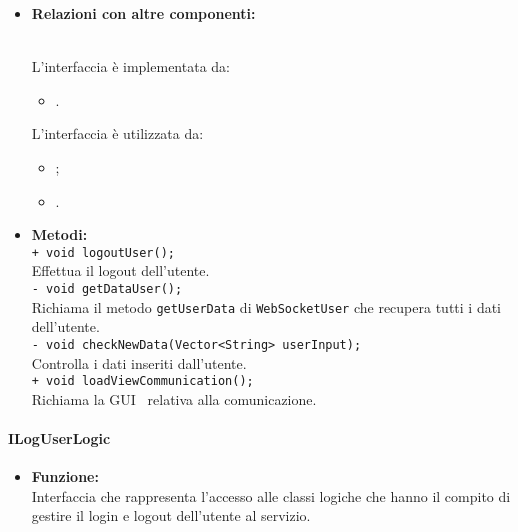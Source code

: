 {{\begin{sloppypar}
{{{\begin{itemize}
				\item[] \textbf{Relazioni con altre componenti:}{\\
				L'interfaccia è implementata da:
				\begin{itemize}
				 	\item[]	.
				\end{itemize}
				L'interfaccia è utilizzata da:
				\begin{itemize}
					\item[] ;
					\item[] .\\
				\end{itemize}
				}
			
				\item[] \textbf{Metodi:}{\\
					\texttt{+ void logoutUser();}\\
					Effettua il logout dell'utente.\\
					
					\texttt{- void getDataUser();}\\
					Richiama il metodo \texttt{getUserData} di \texttt{WebSocketUser} che recupera tutti i dati dell'utente.\\
					
					\texttt{- void checkNewData(Vector<String> userInput);}\\
					Controlla i dati inseriti dall'utente.\\
					
					\texttt{+ void loadViewCommunication();}\\
					Richiama la GUI\g~ relativa alla comunicazione.\\
				}
			\end{itemize}
			}
		

			\paragraph{ILogUserLogic}\label{par:ILogUserLogic}{
			\begin{itemize}
				\item[] \textbf{Funzione:}\\
				Interfaccia che rappresenta l'accesso alle classi logiche che hanno il compito di gestire il login e logout dell'utente al servizio.\\
			

\end{itemize}}}}
\end{sloppypar}}}
